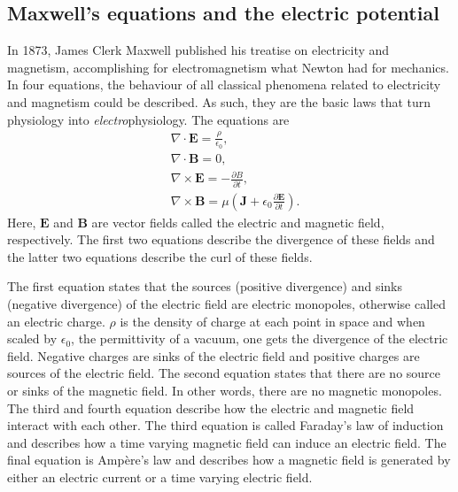 \subsection{Maxwell's equations and the electric potential}
In 1873, James Clerk Maxwell published his treatise on electricity and magnetism, accomplishing for electromagnetism what Newton had for mechanics. In four equations, the behaviour of all classical phenomena related to electricity and magnetism could be described. As such, they are the basic laws that turn physiology into \textit{electro}physiology. The equations are
\begin{align*}
    & \nabla \cdot \bm{E} = \frac{\rho}{\epsilon_0}\mathrm{,} \\
    & \nabla \cdot \bm{B} = 0\mathrm{,} \\
    & \nabla \times \bm{E} = - \frac{\partial {B}}{\partial t}\mathrm{,} \\
    & \nabla \times \bm{B} = \mu \left( \bm{J} + \epsilon_0 \frac{\partial \bm{E}}{\partial t} \right)\mathrm{.}
\end{align*}
Here, $\bm{E}$ and $\bm{B}$ are vector fields called the electric and magnetic field, respectively. The first two equations describe the divergence of these fields and the latter two equations describe the curl of these fields. 

The first equation states that the sources (positive divergence) and sinks (negative divergence) of the electric field are electric monopoles, otherwise called an electric charge. $\rho$ is the density of charge at each point in space and when scaled by $\epsilon_0$, the permittivity of a vacuum, one gets the divergence of the electric field. Negative charges are sinks of the electric field and positive charges are sources of the electric field. The second equation states that there are no source or sinks of the magnetic field. In other words, there are no magnetic monopoles. The third and fourth equation describe how the electric and magnetic field interact with each other. The third equation is called Faraday's law of induction and describes how a time varying magnetic field can induce an electric field. The final equation is Ampère's law and describes how a magnetic field is generated by either an electric current or a time varying electric field.


